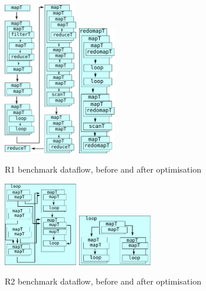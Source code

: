 \begin{figure}
\begin{center}
\includegraphics[width=3.2cm]{img/PricingLexiFi-unfused.pdf}
\hspace{1cm}
\includegraphics[width=1.6cm]{img/PricingLexiFi-fused.pdf}
\end{center}
\caption{R1 benchmark dataflow, before and after optimisation}
\label{fig:r1-dataflow}
\end{figure}

\begin{figure}
\begin{center}
\includegraphics[width=3.2cm]{img/HiperfitEgCos-unfused.pdf}
\hspace{1cm}
\includegraphics[width=3.2cm]{img/HiperfitEgCos-fused.pdf}
\end{center}
\caption{R2 benchmark dataflow, before and after optimisation}
\label{fig:r2-dataflow}
\end{figure}


